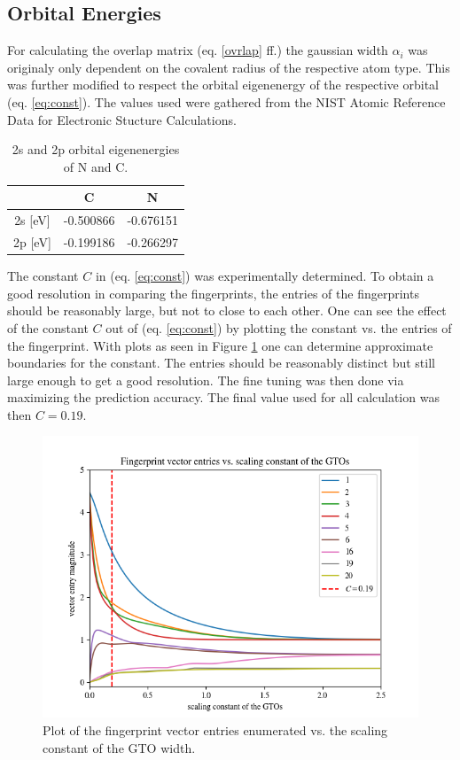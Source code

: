 \subsection{Orbital Energies}
For calculating the overlap matrix (eq. \ref{ovrlap} ff.) the gaussian width $\alpha_i$ was originaly only dependent on the covalent radius of the respective atom type. This was further modified to respect the orbital eigenenergy of the respective orbital (eq. \ref{eq:const}). The values used were gathered from the NIST Atomic Reference Data for Electronic Stucture Calculations.

\begin{table}[h!]
\center
\label{table:energies}
\begin{tabular}{c|c|c}
            & \textbf{C} & \textbf{N} \\ \hline
2s {[}eV{]} & -0.500866  & -0.676151  \\ \hline
2p {[}eV{]} & -0.199186  & -0.266297 
\end{tabular}
\caption{2s and 2p orbital eigenenergies of N and C.}
\end{table}

The constant $C$ in (eq. \ref{eq:const}) was experimentally determined. To obtain a good resolution in comparing the fingerprints, the entries of the fingerprints should be reasonably large, but not to close to each other. One can see the effect of the constant $C$ out of (eq. \ref{eq:const}) by plotting the constant vs. the entries of the fingerprint.
With plots as seen in Figure \ref{fig:const} one can determine approximate boundaries for the constant. The entries should be reasonably distinct but still large enough to get a good resolution. The fine tuning was then done via maximizing the prediction accuracy. The final value used for all calculation was then $C=0.19$.


\begin{figure}[h]

\includegraphics[width=\linewidth]{Figures/fpentry.png}
\caption{Plot of the fingerprint vector entries enumerated vs. the scaling constant of the GTO width.}
\label{fig:const} 
\end{figure}

